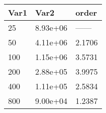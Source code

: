 \begin{tabular}{lll}
Var1 & Var2 & order \\ 
\hline 
25 & 8.93e+06 & ------ \\ 
50 & 4.11e+06 & 2.1706 \\ 
100 & 1.15e+06 & 3.5731 \\ 
200 & 2.88e+05 & 3.9975 \\ 
400 & 1.11e+05 & 2.5834 \\ 
800 & 9.00e+04 & 1.2387 \\ 
\hline 
\end{tabular}